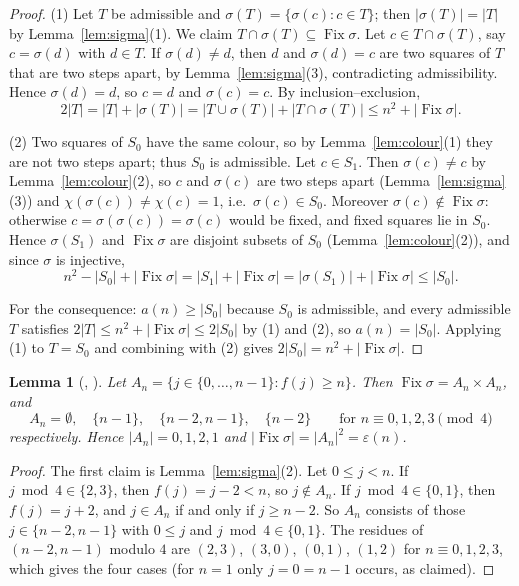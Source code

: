 \documentclass[11pt]{amsart}
\theoremstyle{plain}
\newtheorem{lemma}[theorem]{Lemma}
\theoremstyle{definition}
\newcommand{\Fix}{\operatorname{Fix}}
\begin{document}
\begin{proof}
(1) Let $T$ be admissible and $\sigma(T)=\{\sigma(c):c\in T\}$; then $|\sigma(T)|=|T|$ by Lemma~\ref{lem:sigma}(1). We claim $T\cap\sigma(T)\subseteq\Fix\sigma$. Let $c\in T\cap\sigma(T)$, say $c=\sigma(d)$ with $d\in T$. If $\sigma(d)\ne d$, then $d$ and $\sigma(d)=c$ are two squares of $T$ that are two steps apart, by Lemma~\ref{lem:sigma}(3), contradicting admissibility. Hence $\sigma(d)=d$, so $c=d$ and $\sigma(c)=c$. By inclusion--exclusion,
\[
  2|T|=|T|+|\sigma(T)|=|T\cup\sigma(T)|+|T\cap\sigma(T)|\le n^2+|\Fix\sigma|.
\]

(2) Two squares of $S_0$ have the same colour, so by Lemma~\ref{lem:colour}(1) they are not two steps apart; thus $S_0$ is admissible.
Let $c\in S_1$. Then $\sigma(c)\ne c$ by Lemma~\ref{lem:colour}(2), so $c$ and $\sigma(c)$ are two steps apart (Lemma~\ref{lem:sigma}(3)) and $\chi(\sigma(c))\ne\chi(c)=1$, i.e.\ $\sigma(c)\in S_0$. Moreover $\sigma(c)\notin\Fix\sigma$: otherwise $c=\sigma(\sigma(c))=\sigma(c)$ would be fixed, and fixed squares lie in $S_0$. Hence $\sigma(S_1)$ and $\Fix\sigma$ are disjoint subsets of $S_0$ (Lemma~\ref{lem:colour}(2)), and since $\sigma$ is injective,
\[
  n^2-|S_0|+|\Fix\sigma|=|S_1|+|\Fix\sigma|=|\sigma(S_1)|+|\Fix\sigma|\le|S_0|.
\]

For the consequence: $a(n)\ge|S_0|$ because $S_0$ is admissible, and every admissible $T$ satisfies $2|T|\le n^2+|\Fix\sigma|\le2|S_0|$ by (1) and (2), so $a(n)=|S_0|$. Applying (1) to $T=S_0$ and combining with (2) gives $2|S_0|=n^2+|\Fix\sigma|$.
\end{proof}

\begin{lemma}[, ]\label{lem:A}
Let $A_n=\{j\in\{0,\dots,n-1\}: f(j)\ge n\}$. Then $\Fix\sigma=A_n\times A_n$, and
\[
  A_n=\emptyset,\quad \{n-1\},\quad\{n-2,n-1\},\quad\{n-2\}\qquad\text{for } n\equiv0,1,2,3\pmod4
\]
respectively. Hence $|A_n|=0,1,2,1$ and $|\Fix\sigma|=|A_n|^2=\varepsilon(n)$.
\end{lemma}

\begin{proof}
The first claim is Lemma~\ref{lem:sigma}(2). Let $0\le j<n$. If $j\bmod4\in\{2,3\}$, then $f(j)=j-2<n$, so $j\notin A_n$. If $j\bmod4\in\{0,1\}$, then $f(j)=j+2$, and $j\in A_n$ if and only if $j\ge n-2$. So $A_n$ consists of those $j\in\{n-2,n-1\}$ with $0\le j$ and $j\bmod 4\in\{0,1\}$. The residues of $(n-2,n-1)$ modulo $4$ are $(2,3)$, $(3,0)$, $(0,1)$, $(1,2)$ for $n\equiv0,1,2,3$, which gives the four cases (for $n=1$ only $j=0=n-1$ occurs, as claimed).
\end{proof}
\end{document}
